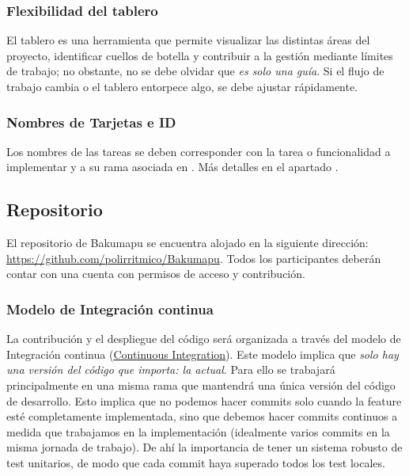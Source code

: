 \subsubsection{Flexibilidad del tablero}\label{flujo:flexibilidad}
El tablero es una herramienta que permite visualizar las distintas áreas del proyecto, identificar cuellos de botella y contribuir a la gestión mediante límites de trabajo; no obstante, no se debe olvidar que \emph{es solo una guía}. Si el flujo de trabajo cambia o el tablero entorpece algo, se debe ajustar rápidamente.

\subsubsection{Nombres de Tarjetas e ID}\label{flujo:nombres-de-tarjetas}
Los nombres de las tareas se deben corresponder con la tarea o funcionalidad a implementar y a su rama asociada en . Más detalles en el apartado .


\subsection{Repositorio}\label{flujo:repositorio}
El repositorio  de Bakumapu se encuentra alojado en la siguiente dirección: \url{https://github.com/polirritmico/Bakumapu}. Todos los participantes deberán contar con una cuenta con permisos de acceso y contribución.

\subsubsection{Modelo de Integración continua}\label{flujo:modelo-de-ic}
La contribución y el despliegue del código será organizada a través del modelo de Integración continua (\href{https://en.wikipedia.org/wiki/Continuous_integration}{Continuous Integration}). Este modelo implica que \emph{solo hay una versión del código que importa: la actual}. Para ello se trabajará principalmente en una misma rama que mantendrá una única versión del código de desarrollo. Esto implica que no podemos hacer commits solo cuando la feature esté completamente implementada, sino que debemos hacer commits continuos a medida que trabajamos en la implementación (idealmente varios commits en la misma jornada de trabajo). De ahí la importancia de tener un sistema robusto de test unitarios, de modo que cada commit haya superado todos los test locales.

